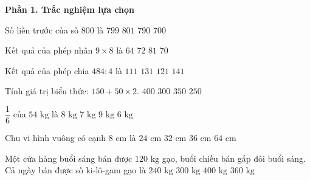 \textbf{Phần 1. Trắc nghiệm lựa chọn}

\begin{ex} %
Số liền trước của số $800$ là
\choice
{\True $799$}
{$801$}
{$790$}
{$700$}
\end{ex}

\begin{ex} %
Kết quả của phép nhân $9 \times 8$ là
\choice
{$64$}
{\True $72$}
{$81$}
{$70$}
\end{ex}

\begin{ex} %
Kết quả của phép chia $484 : 4$ là
\choice
{$111$}
{$131$}
{\True $121$}
{$141$}
\end{ex}

\begin{ex} %
Tính giá trị biểu thức: $150 + 50 \times 2$.
\choice
{$400$}
{$300$}
{$350$}
{\True $250$}
\end{ex}

\begin{ex} %
$\dfrac{1}{6}$ của $54\text{ kg}$ là
\choice
{$8\text{ kg}$}
{$7\text{ kg}$}
{\True $9\text{ kg}$}
{$6\text{ kg}$}
\end{ex}

\begin{ex} %
Chu vi hình vuông có cạnh $8\text{ cm}$ là
\choice
{$24\text{ cm}$}
{\True $32\text{ cm}$}
{$36\text{ cm}$}
{$64\text{ cm}$}
\end{ex}

\begin{ex} %
Một cửa hàng buổi sáng bán được $120\text{ kg}$ gạo, buổi chiều bán gấp đôi buổi sáng. Cả ngày bán được số ki-lô-gam gạo là
\choice
{$240\text{ kg}$}
{$300\text{ kg}$}
{$400\text{ kg}$}
{\True $360\text{ kg}$}
\end{ex}

